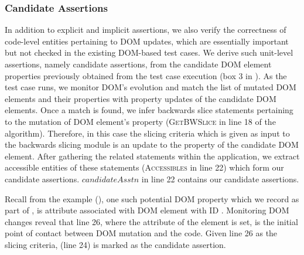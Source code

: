 \subsubsection{Candidate Assertions} \label{Sec:candidateAssertions}
In addition to explicit and implicit assertions, we also verify the correctness of code-level entities pertaining to DOM updates, which are essentially important but not checked in the existing DOM-based test cases. We derive such unit-level assertions, namely candidate assertions, from the candidate DOM element properties previously obtained from the test case execution (box 3 in ). As the test case runs, we monitor DOM's evolution and match the list of mutated DOM elements and their properties with property updates of the candidate DOM elements. Once a match is found, we infer backwards slice statements pertaining to the mutation of DOM element's property (\textsc{GetBWSlice} in line 18 of the algorithm). Therefore, in this case the slicing criteria which is given as input to the backwards slicing module is an update to the property of the candidate DOM element.
After gathering the related \javascript statements within the application, we extract accessible entities of these statements (\textsc{Accessibles} in line 22) which form our candidate assertions. $candidateAsstn$ in line 22 contains our candidate assertions. 

Recall from the example (), one such potential DOM property which we record as part of , is  attribute associated with DOM element with ID . Monitoring DOM changes reveal that line 26, where the  attribute of the element is set, is the initial point of contact between DOM mutation and the \javascript code. Given line 26 as the slicing criteria,  (line 24) is marked as the candidate assertion.